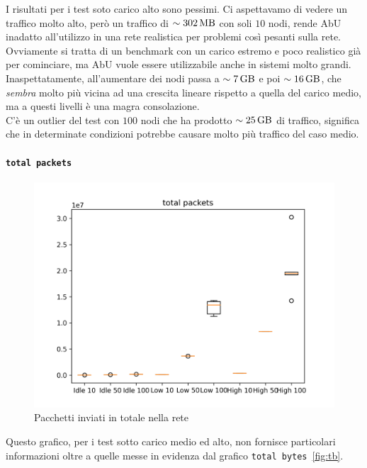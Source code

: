 \documentclass[12pt, a4paper]{article}
\begin{document}
I risultati per i test soto carico alto sono pessimi. Ci aspettavamo di vedere un traffico molto alto, però un traffico di $\sim\qty{302}{\mega\byte}$ con soli $10$ nodi, rende AbU inadatto all'utilizzo in una rete realistica per problemi così pesanti sulla rete.
Ovviamente si tratta di un benchmark con un carico estremo e poco realistico già per cominciare, ma AbU vuole essere utilizzabile anche in sistemi molto grandi.\\
Inaspettatamente, all'aumentare dei nodi passa a $\sim\qty{7}{\giga\byte}$ e poi $\sim\qty{16}{\giga\byte}$, che \emph{sembra} molto più vicina ad una crescita lineare rispetto a quella del carico medio, ma a questi livelli è una magra consolazione.\\
C'è un outlier del test con $100$ nodi che ha prodotto $\sim\qty{25}{\giga\byte}$ di traffico, significa che in determinate condizioni potrebbe causare molto più traffico del caso medio.

\paragraph{\lstinline{total packets}}

\begin{figure}[H]
    \includegraphics[width=\linewidth]{graphs/total packets.png}
    \caption{Pacchetti inviati in totale nella rete}
    \label{fig:tp}
\end{figure}

Questo grafico, per i test sotto carico medio ed alto, non fornisce particolari informazioni oltre a quelle messe in evidenza dal grafico \lstinline{total bytes}~\ref{fig:tb}.
\end{document}
